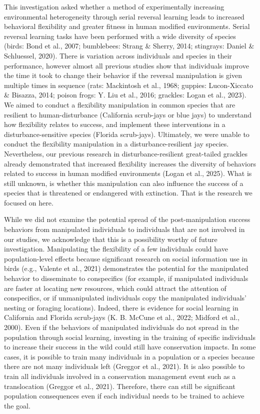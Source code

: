 \documentclass[
]{article}
\begin{document}
This investigation asked whether a method of experimentally increasing
environmental heterogeneity through serial reversal learning leads to
increased behavioral flexibility and greater fitness in human modified
environments. Serial reversal learning tasks have been performed with a
wide diversity of species (birds: Bond et al., 2007; bumblebees: Strang
\& Sherry, 2014; stingrays: Daniel \& Schluessel, 2020). There is
variation across individuals and species in their performance, however
almost all previous studies show that individuals improve the time it
took to change their behavior if the reversal manipulation is given
multiple times in sequence (rats: Mackintosh et al., 1968; guppies:
Lucon-Xiccato \& Bisazza, 2014; poison frogs: Y. Liu et al., 2016;
grackles: Logan et al., 2023). We aimed to conduct a flexibility
manipulation in common species that are resilient to human-disturbance
(California scrub-jays or blue jays) to understand how flexibility
relates to success, and implement these interventions in a
disturbance-sensitive species (Florida scrub-jays). Ultimately, we were
unable to conduct the flexibility manipulation in a
disturbance-resilient jay species. Nevertheless, our previous research
in disturbance-resilient great-tailed grackles already demonstrated that
increased flexibility increases the diversity of behaviors related to
success in human modified environments (Logan et al., 2025). What is
still unknown, is whether this manipulation can also influence the
success of a species that is threatened or endangered with extinction.
That is the research we focused on here.

While we did not examine the potential spread of the post-manipulation
success behaviors from manipulated individuals to individuals that are
not involved in our studies, we acknowledge that this is a possibility
worthy of future investigation. Manipulating the flexibility of a few
individuals could have population-level effects because significant
research on social information use in birds (e.g., Valente et al., 2021)
demonstrates the potential for the manipulated behavior to disseminate
to conspecifics (for example, if manipulated individuals are faster at
locating new resources, which could attract the attention of
conspecifics, or if unmanipulated individuals copy the manipulated
individuals' nesting or foraging locations). Indeed, there is evidence
for social learning in California and Florida scrub-jays (K. B. McCune
et al., 2022; Midford et al., 2000). Even if the behaviors of
manipulated individuals do not spread in the population through social
learning, investing in the training of specific individuals to increase
their success in the wild could still have conservation impacts. In some
cases, it is possible to train many individuals in a population or a
species because there are not many individuals left (Greggor et al.,
2021). It is also possible to train all individuals involved in a
conservation management event such as a translocation (Greggor et al.,
2021). Therefore, there can still be significant population consequences
even if each individual needs to be trained to achieve the goal.
\end{document}
